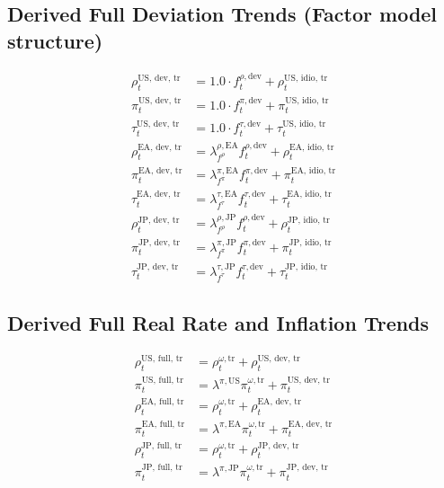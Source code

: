 \documentclass{article}
\begin{document}
\subsection*{Derived Full Deviation Trends (Factor model structure)}
\begin{align}
    \rho^{\text{US, dev, tr}}_t &= 1.0 \cdot f^{\rho, \text{dev}}_t + \rho^{\text{US, idio, tr}}_t \\
    \pi^{\text{US, dev, tr}}_t &= 1.0 \cdot f^{\pi, \text{dev}}_t + \pi^{\text{US, idio, tr}}_t \\
    \tau^{\text{US, dev, tr}}_t &= 1.0 \cdot f^{\tau, \text{dev}}_t + \tau^{\text{US, idio, tr}}_t \\
    \rho^{\text{EA, dev, tr}}_t &= \lambda^{\rho, \text{EA}}_{f^{\rho}} f^{\rho, \text{dev}}_t + \rho^{\text{EA, idio, tr}}_t \\
    \pi^{\text{EA, dev, tr}}_t &= \lambda^{\pi, \text{EA}}_{f^{\pi}} f^{\pi, \text{dev}}_t + \pi^{\text{EA, idio, tr}}_t \\
    \tau^{\text{EA, dev, tr}}_t &= \lambda^{\tau, \text{EA}}_{f^{\tau}} f^{\tau, \text{dev}}_t + \tau^{\text{EA, idio, tr}}_t \\
    \rho^{\text{JP, dev, tr}}_t &= \lambda^{\rho, \text{JP}}_{f^{\rho}} f^{\rho, \text{dev}}_t + \rho^{\text{JP, idio, tr}}_t \\
    \pi^{\text{JP, dev, tr}}_t &= \lambda^{\pi, \text{JP}}_{f^{\pi}} f^{\pi, \text{dev}}_t + \pi^{\text{JP, idio, tr}}_t \\
    \tau^{\text{JP, dev, tr}}_t &= \lambda^{\tau, \text{JP}}_{f^{\tau}} f^{\tau, \text{dev}}_t + \tau^{\text{JP, idio, tr}}_t
\end{align}

\subsection*{Derived Full Real Rate and Inflation Trends}
\begin{align}
    \rho^{\text{US, full, tr}}_t &= \rho^{\omega, \text{tr}}_t + \rho^{\text{US, dev, tr}}_t \\
    \pi^{\text{US, full, tr}}_t &= \lambda^{\pi, \text{US}} \pi^{\omega, \text{tr}}_t + \pi^{\text{US, dev, tr}}_t \\
    \rho^{\text{EA, full, tr}}_t &= \rho^{\omega, \text{tr}}_t + \rho^{\text{EA, dev, tr}}_t \\
    \pi^{\text{EA, full, tr}}_t &= \lambda^{\pi, \text{EA}} \pi^{\omega, \text{tr}}_t + \pi^{\text{EA, dev, tr}}_t \\
    \rho^{\text{JP, full, tr}}_t &= \rho^{\omega, \text{tr}}_t + \rho^{\text{JP, dev, tr}}_t \\
    \pi^{\text{JP, full, tr}}_t &= \lambda^{\pi, \text{JP}} \pi^{\omega, \text{tr}}_t + \pi^{\text{JP, dev, tr}}_t
\end{align}
\end{document}
